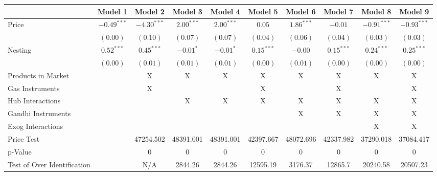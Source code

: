
\begin{tabular}{l c c c c c c c c c}
\toprule
 & Model 1 & Model 2 & Model 3 & Model 4 & Model 5 & Model 6 & Model 7 & Model 8 & Model 9 \\
\midrule
Price                       & $-0.49^{***}$ & $-4.30^{***}$ & $2.00^{***}$ & $2.00^{***}$ & $0.05$       & $1.86^{***}$ & $-0.01$      & $-0.91^{***}$ & $-0.93^{***}$ \\
                            & $(0.00)$      & $(0.10)$      & $(0.07)$     & $(0.07)$     & $(0.04)$     & $(0.06)$     & $(0.04)$     & $(0.03)$      & $(0.03)$      \\
Nesting                     & $0.52^{***}$  & $0.45^{***}$  & $-0.01^{*}$  & $-0.01^{*}$  & $0.15^{***}$ & $-0.00$      & $0.15^{***}$ & $0.24^{***}$  & $0.25^{***}$  \\
                            & $(0.00)$      & $(0.01)$      & $(0.01)$     & $(0.01)$     & $(0.00)$     & $(0.01)$     & $(0.00)$     & $(0.00)$      & $(0.00)$      \\
\midrule
Products in Market          &               & X             & X            & X            & X            & X            & X            & X             & X             \\
Gas Instruments             &               & X             &              &              & X            &              & X            &               & X             \\
Hub Interactions            &               &               & X            & X            & X            & X            & X            & X             & X             \\
Gandhi Instruments          &               &               &              &              &              & X            & X            & X             & X             \\
Exog Interactions           &               &               &              &              &              &              &              & X             & X             \\
Price Test                  &               & 47254.502     & 48391.001    & 48391.001    & 42397.667    & 48072.696    & 42337.982    & 37290.018     & 37084.417     \\
p-Value                     &               & 0             & 0            & 0            & 0            & 0            & 0            & 0             & 0             \\
Test of Over Identification &               & N/A           & 2844.26      & 2844.26      & 12595.19     & 3176.37      & 12865.7      & 20240.58      & 20507.23      \\

\end{tabular}
